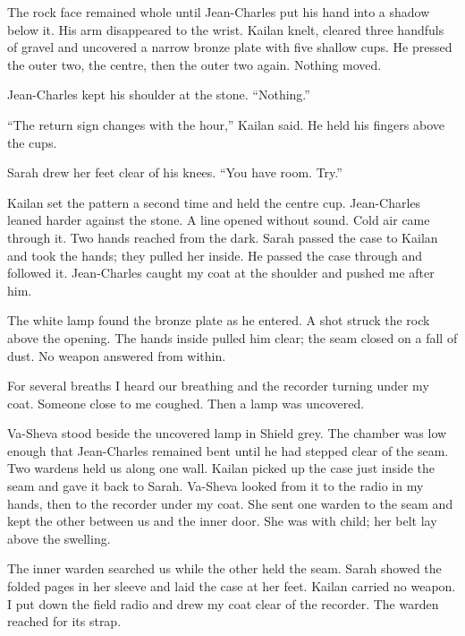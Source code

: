 The rock face remained whole until Jean-Charles put his hand into a shadow below it. His arm disappeared to the wrist. Kailan knelt, cleared three handfuls of gravel and uncovered a narrow bronze plate with five shallow cups. He pressed the outer two, the centre, then the outer two again. Nothing moved.\par

Jean-Charles kept his shoulder at the stone. ``Nothing.''\par

``The return sign changes with the hour,'' Kailan said. He held his fingers above the cups.\par

Sarah drew her feet clear of his knees. ``You have room. Try.''\par

Kailan set the pattern a second time and held the centre cup. Jean-Charles leaned harder against the stone. A line opened without sound. Cold air came through it. Two hands reached from the dark. Sarah passed the case to Kailan and took the hands; they pulled her inside. He passed the case through and followed it. Jean-Charles caught my coat at the shoulder and pushed me after him.\par

The white lamp found the bronze plate as he entered. A shot struck the rock above the opening. The hands inside pulled him clear; the seam closed on a fall of dust. No weapon answered from within.\par

For several breaths I heard our breathing and the recorder turning under my coat. Someone close to me coughed. Then a lamp was uncovered.\par

\ornament

Va-Sheva stood beside the uncovered lamp in Shield grey. The chamber was low enough that Jean-Charles remained bent until he had stepped clear of the seam. Two wardens held us along one wall. Kailan picked up the case just inside the seam and gave it back to Sarah. Va-Sheva looked from it to the radio in my hands, then to the recorder under my coat. She sent one warden to the seam and kept the other between us and the inner door. She was with child; her belt lay above the swelling.\par

The inner warden searched us while the other held the seam. Sarah showed the folded pages in her sleeve and laid the case at her feet. Kailan carried no weapon. I put down the field radio and drew my coat clear of the recorder. The warden reached for its strap.\par

